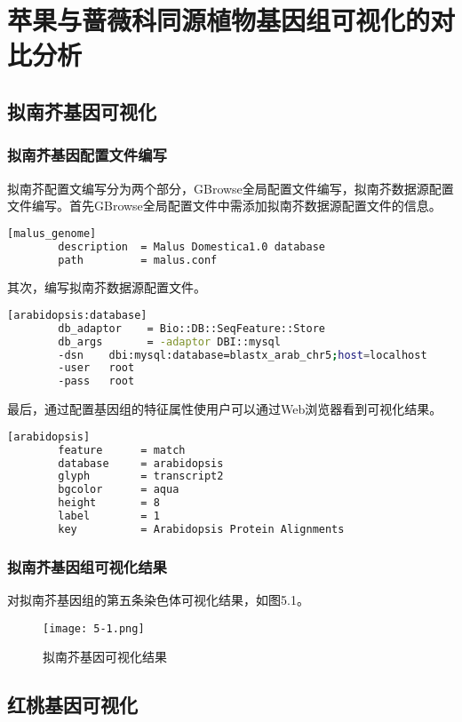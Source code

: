 \chapter{苹果与蔷薇科同源植物基因组可视化的对比分析}
	\section{拟南芥基因可视化}
		\subsection{拟南芥基因配置文件编写}
		拟南芥配置文编写分为两个部分，GBrowse全局配置文件编写，拟南芥数据源配置文件编写。首先GBrowse全局配置文件中需添加拟南芥数据源配置文件的信息。
		\begin{lstlisting}[language=bash]
		[malus_genome]
		description  = Malus Domestica1.0 database
		path         = malus.conf
		\end{lstlisting}
		其次，编写拟南芥数据源配置文件。
		\begin{lstlisting}[language=bash]
		[arabidopsis:database]
		db_adaptor    = Bio::DB::SeqFeature::Store
		db_args       = -adaptor DBI::mysql
		-dsn    dbi:mysql:database=blastx_arab_chr5;host=localhost
		-user   root
		-pass   root
		\end{lstlisting}
		最后，通过配置基因组的特征属性使用户可以通过Web浏览器看到可视化结果。
		\begin{lstlisting}[language=bash]
		[arabidopsis]
		feature      = match
		database     = arabidopsis
		glyph        = transcript2 
		bgcolor      = aqua
		height       = 8
		label        = 1
		key          = Arabidopsis Protein Alignments
		\end{lstlisting}
		\subsection{拟南芥基因组可视化结果}
		对拟南芥基因组的第五条染色体可视化结果，如图5.1。
		\begin{figure}[!ht]
			\centering
			\texttt{[image: 5-1.png]}
			\caption{拟南芥基因可视化结果}
		\end{figure}
	\section{红桃基因可视化}
